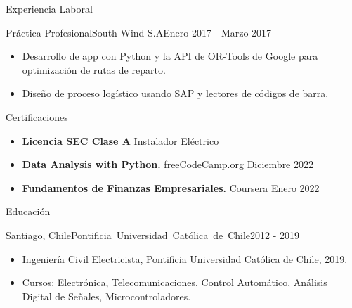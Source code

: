 \documentclass[]{mcdowellcv}
\begin{document}
\begin{cvsection}{Experiencia Laboral}
		\begin{cvsubsection}{Práctica Profesional}{South Wind S.A}{Enero 2017 - Marzo 2017}		
			\begin{itemize}
				\item Desarrollo de app con Python y la API de OR-Tools de Google para optimización de rutas de reparto.
				\item Diseño de proceso logístico usando SAP y lectores de códigos de barra.
			\end{itemize}
		\end{cvsubsection}
		
	\end{cvsection}

	\begin{cvsection}{Certificaciones}
		\begin{cvsubsection}{}{ }{}
			\begin{itemize}
				\item \textbf{\href{https://wlhttp.sec.cl/rnii/public/licencia/qr?o=f5fadb9edfac5b9324c6db95b80eebbe}{Licencia SEC Clase A}} Instalador Eléctrico
				\item \textbf{\href{https://www.freecodecamp.org/certification/fcc97b8767b-5a07-4487-b743-fd7d5742d505/data-analysis-with-python-v7}{Data Analysis with Python.}} freeCodeCamp.org Diciembre 2022
				\item \textbf{\href{https://www.coursera.org/learn/finanzas-empresariales}{Fundamentos de Finanzas Empresariales.}} Coursera Enero 2022
			\end{itemize}
		\end{cvsubsection}
	\end{cvsection}
	
	\begin{cvsection}{Educación}
		\begin{cvsubsection}{Santiago, Chile}{\mbox{Pontificia Universidad Católica de Chile}}{2012 - 2019}
			\begin{itemize}
				\item Ingeniería Civil Electricista, Pontificia Universidad Católica de Chile, 2019.
				\item Cursos: Electrónica, Telecomunicaciones, Control Automático, Análisis Digital de Señales, Microcontroladores.
				\end{itemize}
		\end{cvsubsection}
	\end{cvsection}
	
\end{document}
